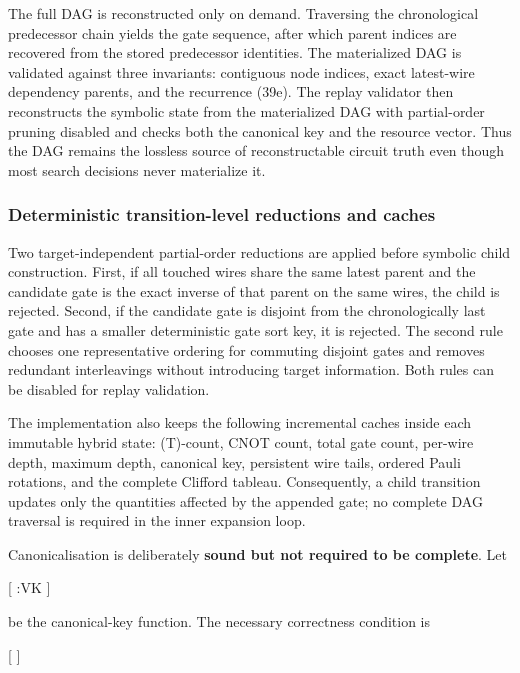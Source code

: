 \documentclass[
]{article}
\begin{document}
The full DAG is reconstructed only on demand. Traversing the
chronological predecessor chain yields the gate sequence, after which
parent indices are recovered from the stored predecessor identities. The
materialized DAG is validated against three invariants: contiguous node
indices, exact latest-wire dependency parents, and the recurrence (39e).
The replay validator then reconstructs the symbolic state from the
materialized DAG with partial-order pruning disabled and checks both the
canonical key and the resource vector. Thus the DAG remains the lossless
source of reconstructable circuit truth even though most search
decisions never materialize it.

\hypertarget{deterministic-transition-level-reductions-and-caches}{%
\subsubsection{Deterministic transition-level reductions and
caches}\label{deterministic-transition-level-reductions-and-caches}}

Two target-independent partial-order reductions are applied before
symbolic child construction. First, if all touched wires share the same
latest parent and the candidate gate is the exact inverse of that parent
on the same wires, the child is rejected. Second, if the candidate gate
is disjoint from the chronologically last gate and has a smaller
deterministic gate sort key, it is rejected. The second rule chooses one
representative ordering for commuting disjoint gates and removes
redundant interleavings without introducing target information. Both
rules can be disabled for replay validation.

The implementation also keeps the following incremental caches inside
each immutable hybrid state: (T)-count, CNOT count, total gate count,
per-wire depth, maximum depth, canonical key, persistent wire tails,
ordered Pauli rotations, and the complete Clifford tableau.
Consequently, a child transition updates only the quantities affected by
the appended gate; no complete DAG traversal is required in the inner
expansion loop.

Canonicalisation is deliberately \textbf{sound but not required to be
complete}. Let

{[} \kappa:V\rightarrow\mathcal K  {]}

be the canonical-key function. The necessary correctness condition is

{[}   {]}
\end{document}
